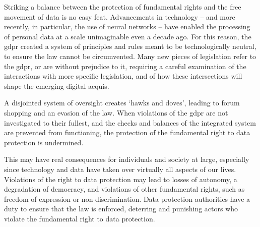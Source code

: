 Striking a balance between the protection of fundamental rights and the free movement of data is no easy feat.
Advancements in technology -- and more recently, in particular, the use of neural networks -- have enabled the processing of personal data at a scale unimaginable even a decade ago.\autocite[recital 6]{GDPR}
For this reason, the \gls{gdpr} created a system of principles and rules meant to be technologically neutral, to ensure the law cannot be circumvented.\autocite[recital 15]{GDPR}
Many new pieces of legislation refer to the \gls{gdpr}, or are without prejudice to it, requiring a careful examination of the interactions with more specific legislation, and of how these intersections will shape the emerging digital acquis.\autocite[215]{zanfirGDPREDPS}

A disjointed system of oversight creates `hawks and doves', leading to forum shopping and an evasion of the law.\autocites[800]{gentileDeficientDesign2022}[point 124]{fbBelgiumAgBobek}
When violations of the \gls{gdpr} are not investigated to their fullest, and the checks and balances of the integrated system are prevented from functioning, the protection of the fundamental right to data protection is undermined.

This may have real consequences for individuals and society at large, especially since technology and data have taken over virtually all aspects of our lives.\autocite{stevensSphereTransgressionsReflecting2024}
Violations of the right to data protection may lead to losses of autonomy, a degradation of democracy, and violations of other fundamental rights, such as freedom of expression or non-discrimination.\autocite[19, 52--53, 348]{fraHandbookDataprotection2018}
Data protection authorities have a duty to ensure that the law is enforced, deterring and punishing actors who violate the fundamental right to data protection.
